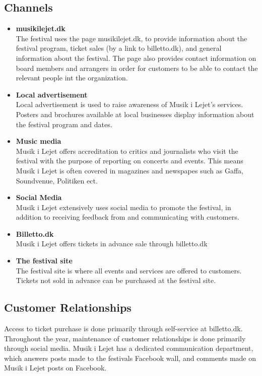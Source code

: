 \subsection{Channels} %
\label{sub:channels}
\begin{itemize}
	\item \textbf{musikilejet.dk}\\
		The festival uses the page musikilejet.dk, to provide information about the festival program, ticket sales (by a link to billetto.dk), and general information about the festival. The page also provides contact information on board members and arrangers in order for customers to be able to contact the relevant people int the organization.
	\item \textbf{Local advertisement}\\
		Local advertisement is used to raise awareness of Musik i Lejet's services. Posters and brochures available at local businesses display information about the festival program and dates.
	\item \textbf{Music media}\\
		Musik i Lejet offers accreditation to critics and journalists who visit the festival with the purpose of reporting on concerts and events. This means Musik i Lejet is often covered in magazines and newspapes such as Gaffa, Soundvenue, Politiken ect.
	\item \textbf{Social Media}\\
		Musik i Lejet extensively uses social media to promote the festival, in addition to receiving feedback from and communicating with customers.
	\item \textbf{Billetto.dk}\\
		Musik i Lejet offers tickets in advance sale through billetto.dk
	\item \textbf{The festival site}\\
		The festival site is where all events and services are offered to customers. Tickets not sold in advance can be purchased at the festival site.
\end{itemize}
\subsection{Customer Relationships} %
\label{sub:customer_relationships}
Access to ticket purchase is done primarily through self-service at billetto.dk. Throughout the year, maintenance of customer relationships is done primarily through social media. Musik i Lejet has a dedicated communication department, which answers posts made to the festivals Facebook wall, and comments made on Musik i Lejet posts on Facebook.

